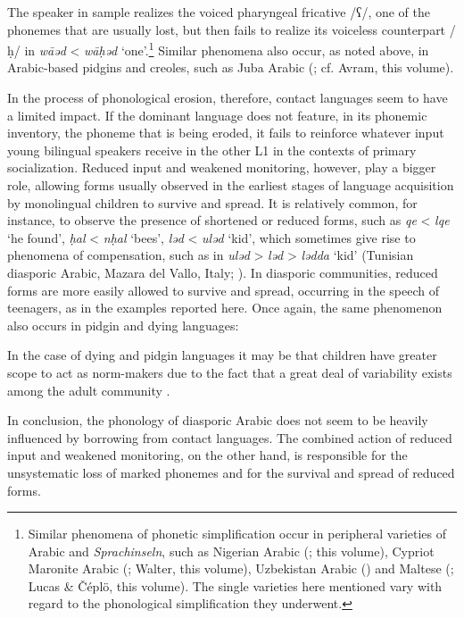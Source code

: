 \documentclass[output=paper]{langsci/langscibook}
\begin{document}
The speaker in sample   realizes the voiced pharyngeal fricative /ʕ/, one of the phonemes that are usually lost, but then fails to realize its voiceless counterpart /ḥ/ in \textit{wāəd} < \textit{wāḥəd} ‘one’.\footnote{Similar phenomena of phonetic simplification occur in peripheral varieties of Arabic and \textit{Sprachinseln}, such as Nigerian Arabic (\citealt[19--20]{Owens1993}; this volume), Cypriot Maronite Arabic (\citealt{Borg1985}; Walter, this volume), Uzbekistan Arabic  (\citealt{Seeger2013article}) and Maltese (\citealt[299]{BorgAzzopardi-Alexander1997}; Lucas \& Čéplö, this volume). The single varieties here mentioned vary with regard to the phonological simplification they underwent.} Similar phenomena also occur, as noted above, in Arabic-based pidgins and creoles, such as Juba Arabic (\citealt[17, 21]{Manfredi2017}; cf. Avram, this volume). 

In the process of phonological erosion, therefore, contact languages seem to have a limited impact. If the dominant language does not feature, in its phonemic inventory, the phoneme that is being eroded, it fails to reinforce whatever input young bilingual speakers receive in the other L1 in the contexts of primary socialization. Reduced input and weakened monitoring, however, play a bigger role, allowing forms usually observed in the earliest stages of language acquisition by monolingual children to survive and spread. It is relatively common, for instance, to observe the presence of shortened or reduced forms, such as \textit{qe} < \textit{lqe} ‘he found’, \textit{ḥal} < \textit{nḥal} ‘bees’, \textit{ləd} < \textit{uləd} ‘kid’, which sometimes give rise to phenomena of compensation, such as in \textit{uləd} > \textit{ləd} > \textit{lədda} ‘kid’ (Tunisian diasporic Arabic, Mazara del Vallo, Italy; \citealt[85]{Danna2017book}). In diasporic communities, reduced forms are more easily allowed to survive and spread, occurring in the speech of teenagers, as in the examples reported here. Once again, the same phenomenon also occurs in pidgin and dying languages: 

In the case of dying and pidgin languages it may be that children have greater scope to act as norm-makers due to the fact that a great deal of variability exists among the adult community \citep[372–373]{Romaine1989}.

In conclusion, the phonology of diasporic Arabic does not seem to be heavily influenced by borrowing from contact languages. The combined action of reduced input and weakened monitoring, on the other hand, is responsible for the unsystematic loss of marked phonemes and for the survival and spread of reduced forms.
\end{document}
